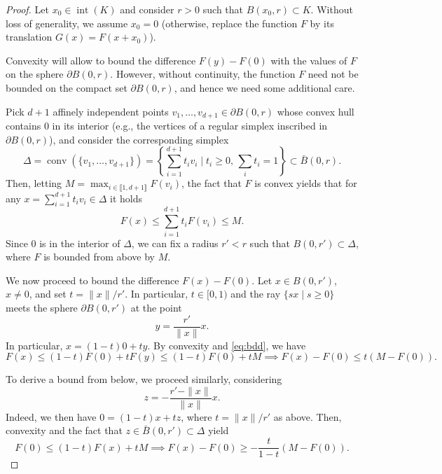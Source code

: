  \begin{proof}
     Let $x_0\in \operatorname{int}(K)$ and consider $r>0$ such that $B(x_0,r)\subset K$. Without loss of generality, we assume $x_0=0$ (otherwise, replace the function $F$ by its translation $G(x) = F(x+x_0)$).
 
     Convexity will allow to bound the difference $F(y)-F(0)$ with the values of $F$ on the sphere $\partial B(0,r)$.
     However, without continuity, the function $F$ need not be bounded on the compact set $\partial B(0,r)$, and hence we need some additional care.
 
     Pick $d+1$ affinely independent points $v_1,\ldots, v_{d+1}\in \partial B(0,r)$ whose convex hull contains $0$ in its interior (e.g., the vertices of a regular simplex inscribed in $\partial B(0,r)$), and consider the corresponding simplex
     \begin{equation}
         \Delta = \operatorname{conv}\left(\{v_1,\ldots,v_{d+1}\}  \right)
         = \left\{  \sum_{i=1}^{d+1} t_i v_i \mid t_i\ge 0,\, \sum_i t_i=1 \right\}\subset \bar B(0,r).
     \end{equation}
     Then, letting $M = \max_{i\in \llbracket1,d+1 \rrbracket} F(v_i)$, the fact that $F$ is convex yields that for any $x=\sum_{i=1}^{d+1} t_i v_i\in \Delta$ it holds
     \begin{equation}
         \label{eq:bdd}
         F(x) \le \sum_{i=1}^{d+1} t_i F(v_i) \le M.
     \end{equation}
     Since $0$ is in the interior of $\Delta$, we can fix a radius $r'<r$ such that  $B(0,r')\subset \Delta$, where $F$ is bounded from above by $M$.
 
     We now proceed to bound the difference $F(x)-F(0)$.
     Let $x\in B(0,r')$, $x\neq 0$, and set $t = \|x\|/r'$. In particular, $t\in [0,1)$ and the ray $\{sx\mid s\ge 0\}$ meets the sphere $\partial B(0,r')$ at the point
     \begin{equation}
         y= \frac{r'}{\|x\|}x.
     \end{equation}
     In particular, $x=(1-t)0 + ty$. By convexity and \eqref{eq:bdd}, we have
     \begin{equation}
         \label{eq:upper}
         F(x) \le (1-t) F(0) + t F(y) \le (1-t)F(0)+ t M
         \implies
         F(x)-F(0) \le t(M-F(0)).
     \end{equation}
 
     To derive a bound from below, we proceed similarly, considering
     \begin{equation}
         z = -\frac{r'-\|x\|}{\|x\|}x.
     \end{equation}
     Indeed, we then have $0 = (1-t)x + t z$, where $t=\|x\|/r'$ as above. Then, convexity and the fact that $z\in \bar B(0,r')\subset\Delta$ yield
     \begin{equation}
         \label{eq:lower}
         F(0)\le (1-t)F(x) +tM \implies F(x)-F(0)\ge -\frac{t}{1-t}(M-F(0)).
     \end{equation}
 

\end{proof}
